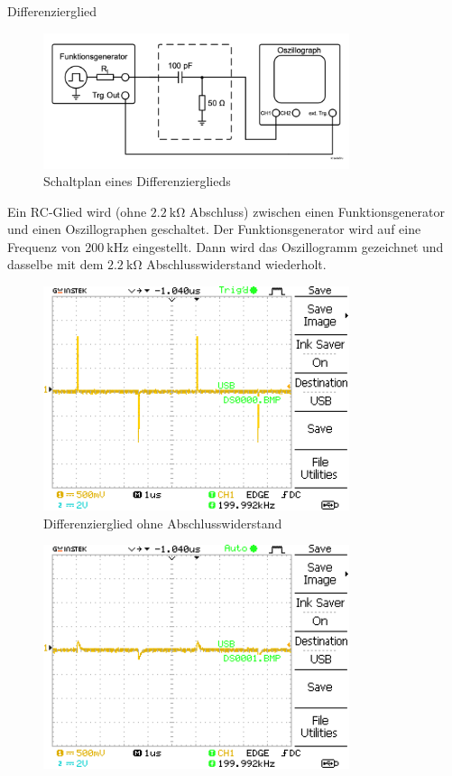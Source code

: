 \documentclass[ngerman]{scrartcl}
\theoremstyle{definition}
\begin{document}
		\begin{aufgabe}{Differenzierglied}
			\aufbau
			\begin{figure}[H]
				\centering
				\includegraphics[width=0.8\textwidth]{figs/Aufbau_1_1_Differenzierglied.png}
				\caption{Schaltplan eines Differenzierglieds~\cite{anleitung}}
				\label{fig:aufbau_1_1_differenzierglied}
			\end{figure}
			Ein RC-Glied wird (ohne $\SI{2.2}{\kilo\ohm}$ Abschluss) zwischen einen Funktionsgenerator und einen Oszillographen geschaltet. Der Funktionsgenerator wird auf eine Frequenz von $\SI{200}{\kilo\hertz}$ eingestellt. Dann wird das Oszillogramm gezeichnet und dasselbe mit dem $\SI{2.2}{\kilo\ohm}$ Abschlusswiderstand wiederholt.
			\messwerte
			\begin{figure}[H]
				\centering
				\includegraphics[width=0.8\textwidth]{MesswerteVersuch1/DS0000.png}
				\caption{Differenzierglied ohne Abschlusswiderstand}
				\label{fig:DS0000}
			\end{figure}
			\begin{figure}[H]
				\centering
				\includegraphics[width=0.8\textwidth]{MesswerteVersuch1/DS0001.png}

\end{figure}
\end{aufgabe}
\end{document}
